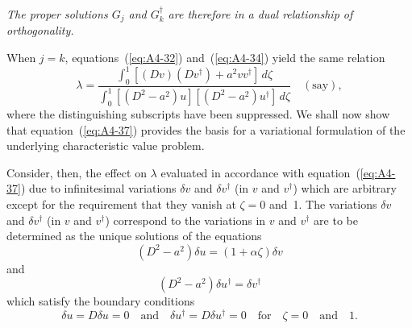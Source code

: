 \emph{The proper solutions $G_j$ and $G_k^\dagger$ are therefore in a dual relationship of
orthogonality.}

When $j = k$, equations~(\ref{eq:A4-32}) and~(\ref{eq:A4-34}) yield the same relation
\begin{equation}
\label{eq:A4-37}
\lambda = \frac{\displaystyle\int_0^1 [(Dv)(Dv^\dagger) + a^2 v v^\dagger] \, d\zeta}{\displaystyle\int_0^1 [(D^2 - a^2)u][(D^2 - a^2)u^\dagger] \, d\zeta} \quad (\text{say}),
\end{equation}
where the distinguishing subscripts have been suppressed. We
shall now show that equation~(\ref{eq:A4-37}) provides the basis for a variational formulation of the underlying characteristic value problem.

Consider, then, the effect on $\lambda$ evaluated in accordance with equation~(\ref{eq:A4-37}) due to infinitesimal variations $\delta v$ and $\delta v^\dagger$ (in $v$ and $v^\dagger$) which are
arbitrary except for the requirement that they vanish at $\zeta = 0$ and~1.
The variations $\delta v$ and $\delta v^\dagger$ (in $v$ and $v^\dagger$) correspond to the variations
in $v$ and $v^\dagger$ are to be determined as the unique solutions of the equations
\begin{equation}
\label{eq:A4-38}
(D^2 - a^2)\delta u = (1 + \alpha\zeta)\delta v
\end{equation}
and
\begin{equation}
\label{eq:A4-39}
(D^2 - a^2)\delta u^\dagger = \delta v^\dagger
\end{equation}
which satisfy the boundary conditions
\begin{equation}
\label{eq:A4-40}
\delta u = D\delta u = 0 \quad \text{and} \quad \delta u^\dagger = D\delta u^\dagger = 0 \quad \text{for} \quad \zeta = 0 \quad \text{and} \quad 1.
\end{equation}

